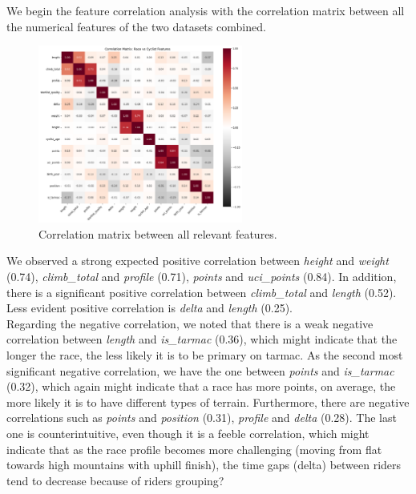 \documentclass[a4paper, twoside,openright]{report}
\begin{document}
 We begin the feature correlation analysis with the correlation matrix between all the numerical features of the two datasets combined.
\begin{figure}[ht]
    \centering
    \includegraphics[width=0.6\textwidth]{assets/correlation_matrix.png}
    \caption{Correlation matrix between all relevant features.}
    \label{fig:correlation-matrix}
\end{figure}
We observed a strong expected positive correlation between \textit{height} and \textit{weight} (0.74), \textit{climb\_total} and \textit{profile} (0.71), \textit{points} and \textit{uci\_points} (0.84).  In addition, there is a significant positive correlation between  \textit{climb\_total} and  \textit{length} (0.52). Less evident positive correlation is \textit{delta} and \textit{length} (0.25). \\
Regarding the negative correlation, we noted that there is a weak negative correlation between \textit{length} and \textit{is\_tarmac} (0.36), which might indicate that the longer the race, the less likely it is to be primary on tarmac.  As the second most significant negative correlation, we have the one between \textit{points} and \textit{is\_tarmac} (0.32), which again might indicate that a race has more points, on average, the more likely it is to have different types of terrain. Furthermore, there are negative correlations such as \textit{points} and \textit{position} (0.31), \textit{profile} and \textit{delta} (0.28). The last one is counterintuitive, even though it is a feeble correlation, which might indicate that as the race profile becomes more challenging (moving from flat towards high mountains with uphill finish), the time gaps (delta) between riders tend to decrease because of riders grouping?
\end{document}
